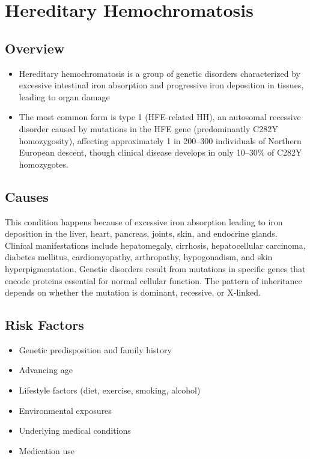 \chapter{Hereditary Hemochromatosis}
\label{sec:Hereditary Hemochromatosis}

\section{Overview}


\begin{itemize}[noitemsep]
  \item Hereditary hemochromatosis is a group of genetic disorders characterized by excessive intestinal iron absorption and progressive iron deposition in tissues, leading to organ damage
  \item The most common form is type 1 (HFE-related HH), an autosomal recessive disorder caused by mutations in the HFE gene (predominantly C282Y homozygosity), affecting approximately 1 in 200--300 individuals of Northern European descent, though clinical disease develops in only 10--30\% of C282Y homozygotes.
\end{itemize}
\section{Causes}
This condition happens because of excessive iron absorption leading to iron deposition in the liver, heart, pancreas, joints, skin, and endocrine glands. Clinical manifestations include hepatomegaly, cirrhosis, hepatocellular carcinoma, diabetes mellitus, cardiomyopathy, arthropathy, hypogonadism, and skin hyperpigmentation. Genetic disorders result from mutations in specific genes that encode proteins essential for normal cellular function. The pattern of inheritance depends on whether the mutation is dominant, recessive, or X-linked.   
\section{Risk Factors}

\begin{itemize}[noitemsep]
  \item Genetic predisposition and family history
  \item Advancing age
  \item Lifestyle factors (diet, exercise, smoking, alcohol)
  \item Environmental exposures
  \item Underlying medical conditions
  \item Medication use
\end{itemize}
